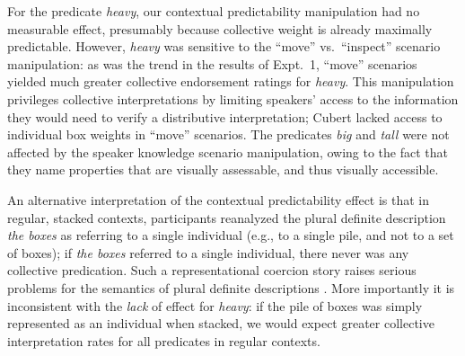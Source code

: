 \documentclass[linguex]{sp}
\begin{document}
For the predicate \emph{heavy}, our contextual predictability manipulation had no measurable effect, presumably because collective weight is already maximally predictable. However, \emph{heavy} was sensitive to the ``move'' vs.~``inspect'' scenario manipulation: as was the trend in the results of Expt.~1, ``move'' scenarios yielded much greater collective endorsement ratings for \emph{heavy}. This manipulation privileges collective interpretations by limiting speakers' access to the information they would need to verify a distributive interpretation; Cubert lacked access to individual box weights in ``move'' scenarios. The predicates \emph{big} and \emph{tall} were not affected by the speaker knowledge scenario manipulation, owing to the fact that they name properties that are visually assessable, and thus visually accessible.

An alternative interpretation of the contextual predictability effect is that in regular, stacked contexts, participants reanalyzed the plural definite description \emph{the boxes} as referring to a single individual (e.g., to a single pile, and not to a set of boxes); if \emph{the boxes} referred to a single individual, there never was any collective predication.
Such a representational coercion story raises serious problems for the semantics of plural definite descriptions \citep[for discussion, see ][]{link1983,landman1989,schwarzschild1996,link1998}. More importantly it is inconsistent with the \emph{lack} of effect for \emph{heavy}: if the pile of boxes was simply represented as an individual when stacked, we would expect greater collective interpretation rates for all predicates in regular contexts.
\end{document}

